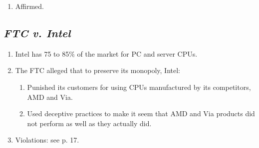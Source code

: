 \begin{enumerate}
\begin{enumerate}
        improvements against its anticompetitive effects. Innovation is 
        \textbf{per se legal} (at least in the Ninth Circuit).
        \item ``~.~.~.~Plaintiffs have provided no evidence that Tyco used its 
        monopoly power to force consumers of pulse oximetry products to adopts 
        its new OxiMax technology. Absent evidence of such compulsion, the 
        only rational inference that can be drawn from some consumers' 
        adoption of OxiMax is that they regarded it to be a superior 
        product.''\footnote{1002.}
        \item No \S\ 2 violation.
    \end{enumerate}
    \item Affirmed.
\end{enumerate}

\subsection{\emph{FTC v. Intel}}

\begin{enumerate}
    \item Intel has 75 to 85\% of the market for PC and server CPUs.
    \item The FTC alleged that to preserve its monopoly, Intel:
    \begin{enumerate}
        \item Punished its customers for using CPUs manufactured by its 
        competitors, AMD and Via.
        \item Used deceptive practices to make it seem that AMD and Via 
        products did not perform as well as they actually did.
    \end{enumerate}
    \item Violations: see p. 17.
\end{enumerate}
